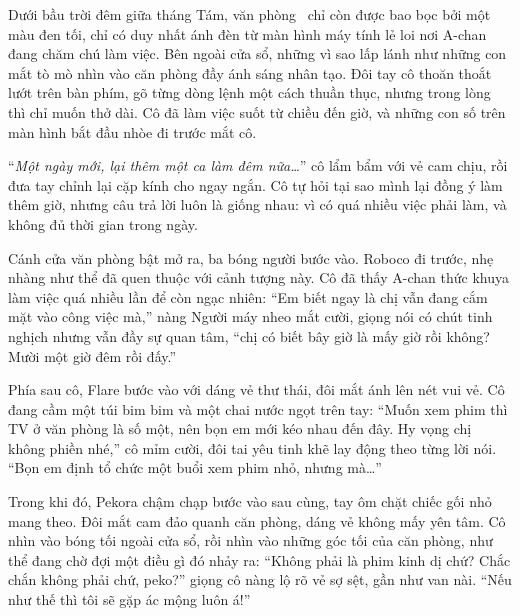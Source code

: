 \documentclass[../main.tex]{subfiles}
\begin{document}

Dưới bầu trời đêm giữa tháng Tám, văn phòng \hll\ chỉ còn được bao bọc bởi một màu đen tối, chỉ có duy nhất ánh đèn từ màn hình máy tính lẻ loi nơi A-chan đang chăm chú làm việc. Bên ngoài cửa sổ, những vì sao lấp lánh như những con mắt tò mò nhìn vào căn phòng đầy ánh sáng nhân tạo. Đôi tay cô thoăn thoắt lướt trên bàn phím, gõ từng dòng lệnh một cách thuần thục, nhưng trong lòng thì chỉ muốn thở dài. Cô đã làm việc suốt từ chiều đến giờ, và những con số trên màn hình bắt đầu nhòe đi trước mắt cô.

``\textit{Một ngày mới, lại thêm một ca làm đêm nữa\dots}'' cô lẩm bẩm với vẻ cam chịu, rồi đưa tay chỉnh lại cặp kính cho ngay ngắn. Cô tự hỏi tại sao mình lại đồng ý làm thêm giờ, nhưng câu trả lời luôn là giống nhau: vì có quá nhiều việc phải làm, và không đủ thời gian trong ngày.


Cánh cửa văn phòng bật mở ra, ba bóng người bước vào. Roboco đi trước, nhẹ nhàng như thể đã quen thuộc với cảnh tượng này. Cô đã thấy A-chan thức khuya làm việc quá nhiều lần để còn ngạc nhiên: ``Em biết ngay là chị vẫn đang cắm mặt vào công việc mà,'' nàng Người máy nheo mắt cười, giọng nói có chút tinh nghịch nhưng vẫn đầy sự quan tâm, ``chị có biết bây giờ là mấy giờ rồi không? Mười một giờ đêm rồi đấy.''

Phía sau cô, Flare bước vào với dáng vẻ thư thái, đôi mắt ánh lên nét vui vẻ. Cô đang cầm một túi bim bim và một chai nước ngọt trên tay: ``Muốn xem phim thì TV ở văn phòng là số một, nên bọn em mới kéo nhau đến đây. Hy vọng chị không phiền nhé,'' cô mỉm cười, đôi tai yêu tinh khẽ lay động theo từng lời nói. ``Bọn em định tổ chức một buổi xem phim nhỏ, nhưng mà\dots''

Trong khi đó, Pekora chậm chạp bước vào sau cùng, tay ôm chặt chiếc gối nhỏ mang theo. Đôi mắt cam đảo quanh căn phòng, dáng vẻ không mấy yên tâm. Cô nhìn vào bóng tối ngoài cửa sổ, rồi nhìn vào những góc tối của căn phòng, như thể đang chờ đợi một điều gì đó nhảy ra: ``Không phải là phim kinh dị chứ? Chắc chắn không phải chứ, peko?'' giọng cô nàng lộ rõ vẻ sợ sệt, gần như van nài. ``Nếu như thế thì tôi sẽ gặp ác mộng luôn á!''
\end{document}
